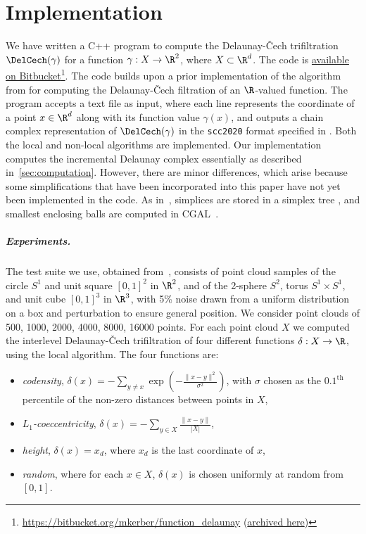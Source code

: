 \section{Implementation}\label{sec:implement}
We have written a C++ program to compute the Delaunay-\v{C}ech trifiltration $\DelCech(\gamma)$ for a function $\gamma: X \to \R^2$, where $X\subset \R^d$. 
The code is
\href{https://bitbucket.org/mkerber/function_delaunay}{available on Bitbucket}\footnote{
\url{https://bitbucket.org/mkerber/function_delaunay} (\href{https://archive.softwareheritage.org/swh:1:dir:95fb3611456975ff368b3cfb5604f4bd9011264e;origin=https://bitbucket.org/mkerber/function_delaunay;visit=swh:1:snp:8ce3f15de54bedbe074deeba25703bdb373e71e3;anchor=swh:1:rev:a481f8d90af7a97795c467d81fb3db2cf952a58e}{archived here})}.  
The code builds upon a prior implementation of the algorithm from \cite{alonsoDelaunayBifiltrationsFunctions2024} for computing the Delaunay-\v{C}ech filtration of an $\R$-valued function.  The program accepts a text file as input, where each line represents the coordinate of a
point $x \in \R^d$ along with its function value $\gamma(x)$, and outputs a chain complex representation of 
$\DelCech(\gamma)$ in the \texttt{scc2020} format specified in
\cite{scc2020}.    Both the local and non-local algorithms are implemented.  
Our implementation computes the incremental Delaunay complex essentially as described in~\cref{sec:computation}.  However, there are minor differences, which arise because some simplifications that have been incorporated into this paper have not yet been implemented in the code.  
As in~\cite{alonsoDelaunayBifiltrationsFunctions2024},  simplices are stored in a
simplex tree \cite{boissonnat2014simplextree, gudhi:FilteredComplexes}, 
and smallest enclosing balls are computed in CGAL~\cite{cgal:fghhs-bv-24a}.
%
%
%
\subparagraph{Experiments.} The test suite we use, obtained from~\cite{kerber_2025_rxedk-qyq77}, consists of point cloud samples of the circle $S^1$ and unit square $[0, 1]^2$ in $\R^2$, and of the 2-sphere $S^2$, torus $S^1 \times S^1$, and unit cube $[0, 1]^3$ in $\R^3$, with 5\% noise drawn from a uniform distribution on a box and perturbation to ensure general position.  We consider point clouds of 500, 1000, 2000, 4000, 8000, 16000 points.
%
For each point cloud $X$ we computed the interlevel Delaunay-\v{C}ech trifiltration of four different functions $\delta: X \to \R$, using the local algorithm.  
The four functions are:
\begin{itemize}
    \item \emph{codensity},
    $\delta(x) = -\sum\limits_{y\neq x}{\exp{\left(-\frac{\|x-y\|^2}{\sigma^2}\right)}}$,
    with $\sigma$ chosen as the $0.1^{\mathrm{th}}$ percentile of the non-zero distances between points in $X$, 
    \item \emph{$L_1$-coeccentricity},
    $\delta (x) = -\sum\limits_{y\in X}{\frac{\|x-y\|}{|X|}}$,
    \item \emph{height}, $\delta(x) = x_d$, where $x_d$ is the last coordinate of $x$,
    \item \emph{random}, where for each $x\in X$, $\delta(x)$ is chosen uniformly at random from $[0,1]$.
\end{itemize}
